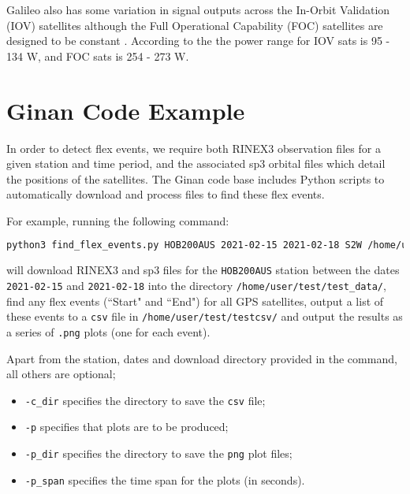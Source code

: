 Galileo also has some variation in signal outputs across the In-Orbit Validation (IOV) satellites although the Full Operational Capability (FOC) satellites are designed to be constant \citep{bar-sever_why_2019}. According to the  \cite{steigenberger_gnss_2018} the power range for IOV sats is 95 - 134 W, and FOC sats is 254 - 273 W.


\section{Ginan Code Example}
In order to detect flex events, we require both RINEX3 observation files for a given station and time period, and the associated sp3 orbital files which detail the positions of the satellites. The Ginan code base includes Python scripts to automatically download and process files to find these flex events. 


For example, running the following command:


\begin{lstlisting}[language=bash]
python3 find_flex_events.py HOB200AUS 2021-02-15 2021-02-18 S2W /home/user/test/test_data/ -c_dir /home/user/test/test_csv/ -p -p_dir /home/user/test/test_plts/ -p_span 2400
\end{lstlisting}


will download RINEX3 and sp3 files for the \texttt{HOB200AUS} station between the dates \texttt{2021-02-15} and \texttt{2021-02-18} into the directory \texttt{/home/user/test/test\_data/}, find any flex events (``Start" and ``End") for all GPS satellites, output a list of these events to a \texttt{csv} file in \texttt{/home/user/test/testcsv/} and output the results as a series of \texttt{.png} plots (one for each event). 


Apart from the station, dates and download directory provided in the command, all others are optional;

\begin{itemize}
    \item \texttt{-c\_dir} specifies the directory to save the \texttt{csv} file;
    \item \texttt{-p} specifies that plots are to be produced;
    \item \texttt{-p\_dir} specifies the directory to save the \texttt{png} plot files;
    \item \texttt{-p\_span} specifies the time span for the plots (in seconds).
\end{itemize}